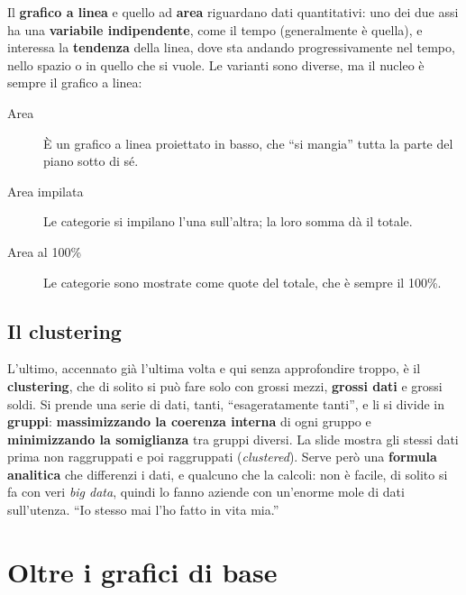 Il \textbf{grafico a linea} e quello ad \textbf{area} riguardano dati
quantitativi: uno dei due assi ha una \textbf{variabile indipendente}, come il
tempo (generalmente è quella), e interessa la \textbf{tendenza} della linea,
dove sta andando progressivamente nel tempo, nello spazio o in quello che si
vuole. Le varianti sono diverse, ma il nucleo è sempre il grafico a linea:
\begin{description}
  \item[Area] È un grafico a linea proiettato in basso, che ``si mangia''
        tutta la parte del piano sotto di sé.
  \item[Area impilata] Le categorie si impilano l'una sull'altra; la loro
        somma dà il totale.
  \item[Area al 100\%] Le categorie sono mostrate come quote del totale, che
        è sempre il 100\%.
\end{description}

\subsection{Il clustering}

L'ultimo, accennato già l'ultima volta e qui senza approfondire troppo, è il
\textbf{clustering}, che di solito si può fare solo con grossi mezzi,
\textbf{grossi dati} e grossi soldi. Si prende una serie di dati, tanti,
``esageratamente tanti'', e li si divide in \textbf{gruppi}:
\textbf{massimizzando la coerenza interna} di ogni gruppo e
\textbf{minimizzando la somiglianza} tra gruppi diversi. La slide mostra gli
stessi dati prima non raggruppati e poi raggruppati (\emph{clustered}). Serve
però una \textbf{formula analitica} che differenzi i dati, e qualcuno che la
calcoli: non è facile, di solito si fa con veri \emph{big data}, quindi lo
fanno aziende con un'enorme mole di dati sull'utenza. ``Io stesso mai l'ho
fatto in vita mia.''

\section{Oltre i grafici di base}
\label{sec:grafici-avanzati}



